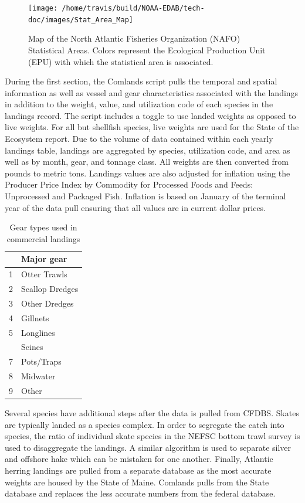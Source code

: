 \documentclass[
]{book}
\begin{document}
\begin{figure}

{\centering \texttt{[image: /home/travis/build/NOAA-EDAB/tech-doc/images/Stat\_Area\_Map]} 

}

\caption{Map of the North Atlantic Fisheries Organization (NAFO) Statistical Areas.  Colors represent the Ecological Production Unit (EPU) with which the statistical area is associated.}\label{fig:StatAreaMap}
\end{figure}

During the first section, the Comlands script pulls the temporal and spatial information as well as vessel and gear characteristics associated with the landings in addition to the weight, value, and utilization code of each species in the landings record. The script includes a toggle to use landed weights as opposed to live weights. For all but shellfish species, live weights are used for the State of the Ecosystem report. Due to the volume of data contained within each yearly landings table, landings are aggregated by species, utilization code, and area as well as by month, gear, and tonnage class. All weights are then converted from pounds to metric tons. Landings values are also adjusted for inflation using the Producer Price Index by Commodity for Processed Foods and Feeds: Unprocessed and Packaged Fish. Inflation is based on January of the terminal year of the data pull ensuring that all values are in current dollar prices.

\begin{table}

\caption{\label{tab:geartypes}Gear types used in commercial landings}
\centering
\begin{tabular}[t]{rl}
\toprule
 & Major gear\\
\midrule
1 & Otter Trawls\\
2 & Scallop Dredges\\
3 & Other Dredges\\
4 & Gillnets\\
5 & Longlines\\
\addlinespace
6 & Seines\\
7 & Pots/Traps\\
8 & Midwater\\
9 & Other\\
\bottomrule
\end{tabular}
\end{table}

Several species have additional steps after the data is pulled from CFDBS. Skates are typically landed as a species complex. In order to segregate the catch into species, the ratio of individual skate species in the NEFSC bottom trawl survey is used to disaggregate the landings. A similar algorithm is used to separate silver and offshore hake which can be mistaken for one another. Finally, Atlantic herring landings are pulled from a separate database as the most accurate weights are housed by the State of Maine. Comlands pulls from the State database and replaces the less accurate numbers from the federal database.
\end{document}
